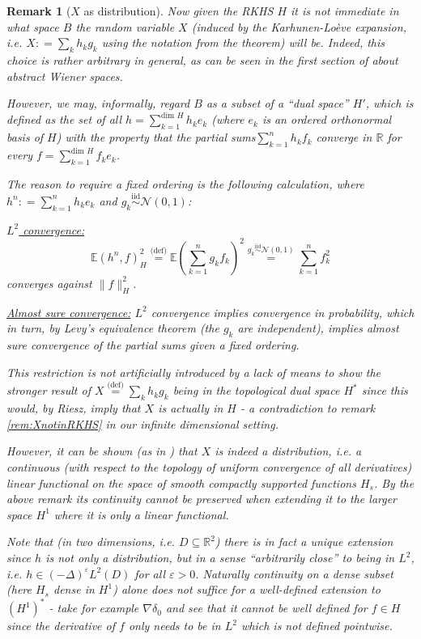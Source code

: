\documentclass[11pt,reqno]{amsart}
\numberwithin{equation}{section}
\newtheorem{rem}[thm]{Remark}
\newcommand{\eqby}[1]{\mathrel{\stackrel{#1}{=}}}
\newcommand{\eqbydef}{\mathrel{\stackrel{\text{(def)}}{=}}}
\newcommand{\deq}{\mathrel{\mathop:}=}
\newcommand{\iidnormal}{\mathrel{\stackrel{\text{iid}}{\sim}}\mathcal N(0,1)}
\newcommand{\eps}{\varepsilon}
\begin{document}
\begin{rem}[$X$ as distribution]\label{rem:spaceofX}
	Now given the RKHS $H$ it is not immediate in what space $B$ the random variable $X$ (induced by the Karhunen-Lo\`eve expansion, i.e. $X\deq \sum_k h_kg_k$ using the notation from the theorem) will be. Indeed, this choice is rather arbitrary in general, as can be seen in the first section of \cite{She07} about abstract Wiener spaces.
	
	However, we may, informally, regard $B$ as a subset of a ``dual space'' $H'$, which is defined as the set of all $h=\sum_{k=1}^{\text{dim }H}h_ke_k$ (where $e_k$ is an \emph{ordered} orthonormal basis of $H$) with the property that the partial sums$\sum_{k=1}^n h_kf_k$ converge in $\mathbb R$ for every $f=\sum_{k=1}^{\text{dim }H}f_ke_k$.
	
	The reason to require a fixed ordering is the following calculation, where $h^n\deq \sum_{k=1}^n h_ke_k$ and $g_k\iidnormal$:
	
	\underline{$L^2$ convergence:}
	\begin{equation}\label{eq:varianceofHasRandomDistribution}
		\mathbb E(h^n,f)_H^2 \eqbydef \mathbb E\left(\sum_{k=1}^n g_k f_k\right)^2 \eqby{g_k\iidnormal} \sum_{k=1}^n f_k^2
	\end{equation} converges against $\|f\|_H^2$.
	
	\underline{Almost sure convergence:} $L^2$ convergence implies convergence in probability, which in turn, by Levy's equivalence theorem (the $g_k$ are independent), implies almost sure convergence of the \emph{partial sums} given a fixed ordering.
	
	This restriction is not artificially introduced by a lack of means to show the stronger result of $X\eqbydef \sum_k h_kg_k$ being in the topological dual space $H^*$ since this would, by Riesz, imply that $X$ is actually in $H$ - a contradiction to remark \ref{rem:XnotinRKHS} in our infinite dimensional setting.
	
	However, it can be shown (as in \cite{She07}) that $X$ is indeed a distribution, i.e. a continuous (with respect to the topology of uniform convergence of all derivatives) linear functional on the space of smooth compactly supported functions $H_s$. By the above remark its continuity cannot be preserved when extending it to the larger space $H^1$ where it is only a linear functional.
	
	Note that (in two dimensions, i.e. $D\subseteq\mathbb R^2$) there is in fact a unique extension since $h$ is not only a distribution, but in a sense ``arbitrarily close'' to being in $L^2$, i.e. $h\in (-\Delta)^\eps L^2(D)$ for all $\eps>0$. Naturally continuity on a dense subset (here $H_s$ dense in $H^1$) alone does not suffice for a well-defined extension to $(H^1)^*$ - take for example $\nabla\delta_0$ and see that it cannot be well defined for $f\in H$ since the derivative of $f$ only needs to be in $L^2$ which is not defined pointwise.
\end{rem}
\end{document}
